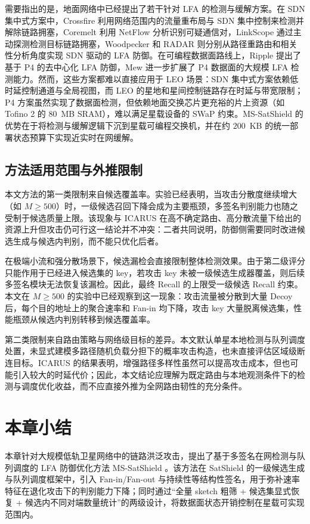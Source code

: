 需要指出的是，地面网络中已经提出了若干针对 LFA 的检测与缓解方案。在 SDN 集中式方案中，Crossfire 利用网络范围内的流量重布局与 SDN 集中控制来检测并解除链路拥塞，Coremelt 利用 NetFlow 分析识别可疑通信对，LinkScope 通过主动探测检测目标链路拥塞，Woodpecker 和 RADAR 则分别从路径重路由和相关性分析角度实现 SDN 驱动的 LFA 防御。在可编程数据面路线上，Ripple 提出了基于 P4 的去中心化 LFA 防御，Mew 进一步扩展了 P4 数据面的大规模 LFA 检测能力。然而，这些方案都难以直接应用于 LEO 场景：SDN 集中式方案依赖低时延控制通道与全局视图，而 LEO 的星地和星间控制链路存在时延与带宽限制；P4 方案虽然实现了数据面检测，但依赖地面交换芯片更充裕的片上资源（如 Tofino 2 的 80~MB SRAM），难以满足星载设备的 SWaP 约束。MS-SatShield 的优势在于将检测与缓解逻辑下沉到星载可编程交换机，并在约 $200$~KB 的统一部署状态预算下实现近实时在网缓解。

\subsection{方法适用范围与外推限制}
本文方法的第一类限制来自候选覆盖率。实验已经表明，当攻击分散度继续增大（如 $M\geq500$）时，一级候选召回下降会成为主要瓶颈，多签名判别能力也随之受制于候选质量上限。该现象与 ICARUS 在高不确定路由、高分散流量下给出的资源上升但攻击仍可行这一结论并不冲突：二者共同说明，防御侧需要同时改进候选生成与候选内判别，而不能只优化后者。

在极端小流和强分散场景下，候选漏检会直接限制整体检测效果。由于第二级评分只能作用于已经进入候选集的 key，若攻击 key 未被一级候选生成器覆盖，则后续多签名模块无法恢复该漏检。因此，最终 Recall 的上限受一级候选 Recall 约束。本文在 $M\geq500$ 的实验中已经观察到这一现象：攻击流量被分散到大量 Decoy 后，每个目的地址上的聚合速率和 Fan-in 均下降，攻击 key 大量脱离候选集，性能瓶颈从候选内判别转移到候选覆盖率。

第二类限制来自路由策略与网络级目标的差异。本文默认单星本地检测与队列调度处置，未显式建模多路径随机负载分担下的概率攻击构造，也未直接评估区域级断连目标。ICARUS 的结果表明，增强路径多样性虽然可以提高攻击成本，但也可能引入较大的时延代价；因此，本文结论应理解为既定路由与本地观测条件下的检测与调度优化收益，而不应直接外推为全网路由韧性的充分条件。

\section{本章小结}
本章针对大规模低轨卫星网络中的链路洪泛攻击，提出了基于多签名在网检测与队列调度的 LFA 防御优化方法 MS-SatShield 。该方法在 SatShield 的一级候选生成与队列调度框架中，引入 Fan-in/Fan-out 与持续性等结构性签名，用于弥补速率特征在退化攻击下的判别能力下降；同时通过“全量 sketch 粗筛 + 候选集显式恢复 + 候选内不同对端数量统计”的两级设计，将数据面状态开销控制在星载可实现范围内。

